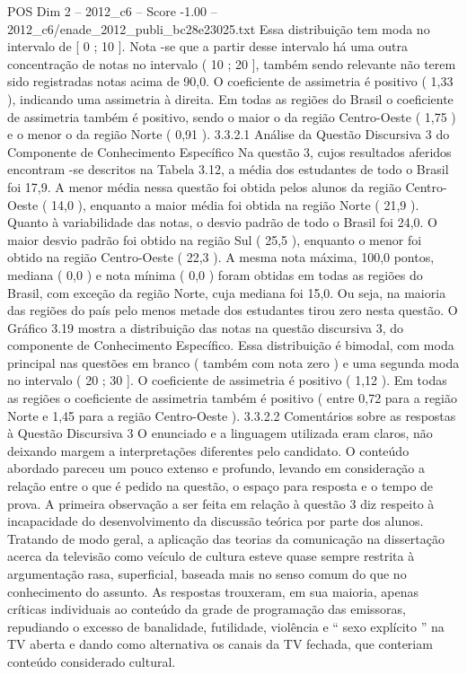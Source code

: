 \begin{textsample}{POS Dim 2 – 2012\_c6 – Score -1.00 – 2012\_c6/enade\_2012\_publi\_bc28e23025.txt}
Essa distribuição tem moda no intervalo de [ 0 ; 10 ].
Nota -se que a partir desse intervalo há uma outra concentração de notas no intervalo ( 10 ; 20 ], também sendo relevante não terem sido registradas notas acima de 90,0.
O coeficiente de assimetria é positivo ( 1,33 ), indicando uma assimetria à direita.
Em todas as regiões do Brasil o coeficiente de assimetria também é positivo, sendo o maior o da região Centro-Oeste ( 1,75 ) e o menor o da região Norte ( 0,91 ). 3.3.2.1 Análise da Questão Discursiva 3 do Componente de Conhecimento Específico Na questão 3, cujos resultados aferidos encontram -se descritos na Tabela 3.12, a média dos estudantes de todo o Brasil foi 17,9.
A menor média nessa questão foi obtida pelos alunos da região Centro-Oeste ( 14,0 ), enquanto a maior média foi obtida na região Norte ( 21,9 ).
Quanto à variabilidade das notas, o desvio padrão de todo o Brasil foi 24,0.
O maior desvio padrão foi obtido na região Sul ( 25,5 ), enquanto o menor foi obtido na região Centro-Oeste ( 22,3 ).
A mesma nota máxima, 100,0 pontos, mediana ( 0,0 ) e nota mínima ( 0,0 ) foram obtidas em todas as regiões do Brasil, com exceção da região Norte, cuja mediana foi 15,0.
Ou seja, na maioria das regiões do país pelo menos metade dos estudantes tirou zero nesta questão.
O Gráfico 3.19 mostra a distribuição das notas na questão discursiva 3, do componente de Conhecimento Específico.
Essa distribuição é bimodal, com moda principal nas questões em branco ( também com nota zero ) e uma segunda moda no intervalo ( 20 ; 30 ].
O coeficiente de assimetria é positivo ( 1,12 ).
Em todas as regiões o coeficiente de assimetria também é positivo ( entre 0,72 para a região Norte e 1,45 para a região Centro-Oeste ). 3.3.2.2 Comentários sobre as respostas à Questão Discursiva 3 O enunciado e a linguagem utilizada eram claros, não deixando margem a interpretações diferentes pelo candidato.
O conteúdo abordado pareceu um pouco extenso e profundo, levando em consideração a relação entre o que é pedido na questão, o espaço para resposta e o tempo de prova.
A primeira observação a ser feita em relação à questão 3 diz respeito à incapacidade do desenvolvimento da discussão teórica por parte dos alunos.
Tratando de modo geral, a aplicação das teorias da comunicação na dissertação acerca da televisão como veículo de cultura esteve quase sempre restrita à argumentação rasa, superficial, baseada mais no senso comum do que no conhecimento do assunto.
As respostas trouxeram, em sua maioria, apenas críticas individuais ao conteúdo da grade de programação das emissoras, repudiando o excesso de banalidade, futilidade, violência e “ sexo explícito ” na TV aberta e dando como alternativa os canais da TV fechada, que conteriam conteúdo considerado cultural.

\end{textsample}
